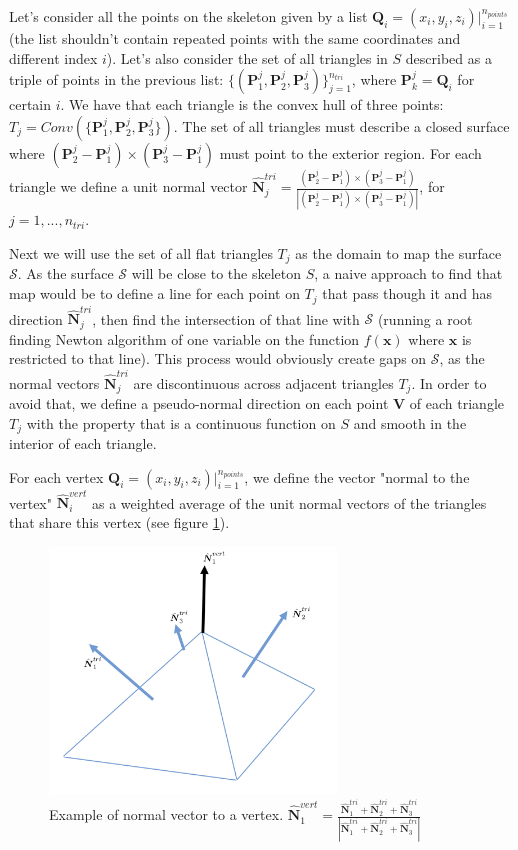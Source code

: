 \documentclass[11pt]{article}
\newcommand\bx{\boldsymbol x}
\newcommand\bP{\boldsymbol P}
\newcommand\bN{\boldsymbol N}
\newcommand\bQ{\boldsymbol Q}
\newcommand\bV{\boldsymbol V}
\begin{document}
Let's consider all the points on the skeleton given by a list $\bQ_i=(x_i,y_i,z_i)\big|_{i=1}^{n_{points}}$ (the list shouldn't contain repeated points with the same coordinates and different index $i$). Let's also consider the set of all triangles in $\mathit{S}$ described as a triple of points in the previous list: $\{(\bP_1^j,\bP_2^j,\bP_3^j)\}_{j=1}^{n_{tri}}$, where $\bP_k^j=\bQ_i$ for certain $i$. We have that each triangle is the convex hull of three points: $\mathit{T}_j=Conv(\{\bP_1^j,\bP_2^j,\bP_3^j\})$. The set of all triangles must describe a closed surface where $(\bP^j_2-\bP^j_1)\times (\bP^j_3-\bP^j_1)$ must point to the exterior region. For each triangle we define a unit normal vector $\hat{\bN}^{tri}_j=\frac{(\bP^j_2-\bP^j_1)\times (\bP^j_3-\bP^j_1)}{|(\bP^j_2-\bP^j_1)\times (\bP^j_3-\bP^j_1)|}$, for $j=1,...,n_{tri}$.

Next we will use the set of all flat triangles $\mathit{T}_j$ as the domain to map the surface $\mathcal{S}$. As the surface $\mathcal{S}$ will be close to the skeleton $\mathit{S}$, a naive approach to find that map would be to define a line for each point on $\mathit{T}_j$ that pass though it and has direction $\hat{\bN}^{tri}_j$, then find the intersection of that line with $\mathcal{S}$ (running a root finding Newton algorithm of one variable on the function $f(\bx)$ where $\bx$ is restricted to that line). This process would obviously create gaps on $\mathcal{S}$, as the normal vectors $\hat{\bN}^{tri}_j$ are discontinuous across adjacent triangles $\mathit{T}_j$. In order to avoid that, we define a pseudo-normal direction on each point $\bV$ of each triangle $\mathit{T}_j$ with the property that is a continuous function on $\mathit{S}$ and smooth in the interior of each triangle.

For each vertex $\bQ_i=(x_i,y_i,z_i)\big|_{i=1}^{n_{points}}$, we define the vector "normal to the vertex" $\hat{\bN}_i^{vert}$ as a weighted average of the unit normal vectors of the triangles that share this vertex (see figure \ref{normalvert1}).

\begin{figure}[H]
\begin{center}
\includegraphics[width=3in]{normal_vertex.png}%
\end{center}
\caption{Example of normal vector to a vertex. $\hat{\bN}_1^{vert}=\frac{\hat{\bN}_1^{tri}+\hat{\bN}_2^{tri}+\hat{\bN}_3^{tri}}{|\hat{\bN}_1^{tri}+\hat{\bN}_2^{tri}+\hat{\bN}_3^{tri}|}$}
\label{normalvert1}
\end{figure}
\end{document}
